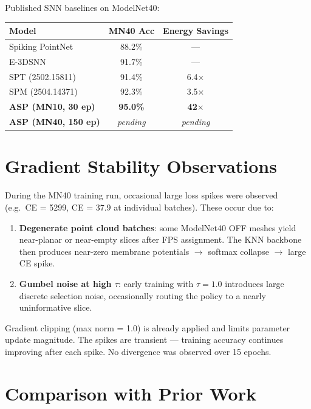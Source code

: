 \documentclass[11pt,a4paper]{article}
\begin{document}
Published SNN baselines on ModelNet40:

\begin{center}
\begin{tabular}{lcc}
\toprule
\textbf{Model} & \textbf{MN40 Acc} & \textbf{Energy Savings} \\
\midrule
Spiking PointNet & 88.2\% & --- \\
E-3DSNN & 91.7\% & --- \\
SPT (2502.15811) & 91.4\% & 6.4$\times$ \\
SPM (2504.14371) & 92.3\% & 3.5$\times$ \\
\midrule
\textbf{ASP (MN10, 30 ep)} & \textbf{95.0\%} & \textbf{42$\times$} \\
\textbf{ASP (MN40, 150 ep)} & \textit{pending} & \textit{pending} \\
\bottomrule
\end{tabular}
\end{center}

\section{Gradient Stability Observations}

During the MN40 training run, occasional large loss spikes were observed
(e.g.\ CE = 5299, CE = 37.9 at individual batches). These occur due to:

\begin{enumerate}
  \item \textbf{Degenerate point cloud batches}: some ModelNet40 OFF meshes yield near-planar
        or near-empty slices after FPS assignment. The KNN backbone then produces near-zero
        membrane potentials $\to$ softmax collapse $\to$ large CE spike.
  \item \textbf{Gumbel noise at high $\tau$}: early training with $\tau=1.0$ introduces
        large discrete selection noise, occasionally routing the policy to a nearly
        uninformative slice.
\end{enumerate}

Gradient clipping (max norm = 1.0) is already applied and limits parameter update magnitude.
The spikes are transient --- training accuracy continues improving after each spike. No divergence
was observed over 15 epochs.

\section{Comparison with Prior Work}
\end{document}
